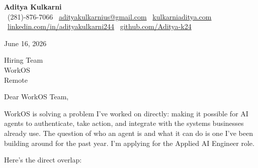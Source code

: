 \documentclass[11pt]{article}
\begin{document}
\begin{center}
  {\LARGE \textbf{Aditya Kulkarni}} \\[4pt]
  \small
  \faPhone\ (281)-876-7066 \quad
  \faEnvelope\ \href{mailto:adityakulkarnius@gmail.com}{adityakulkarnius@gmail.com} \quad
  \faGlobe\ \href{https://www.kulkarniaditya.com}{kulkarniaditya.com} \quad
  \faLinkedin\ \href{https://www.linkedin.com/in/adityakulkarni244/}{linkedin.com/in/adityakulkarni244} \quad
  \faGithub\ \href{https://github.com/Aditya-k24}{github.com/Aditya-k24}
\end{center}

\vspace{6pt}

June 16, 2026

\vspace{6pt}

Hiring Team \\
WorkOS \\
Remote

\vspace{10pt}

Dear WorkOS Team,

\vspace{6pt}

WorkOS is solving a problem I've worked on directly: making it possible for AI agents to authenticate, take action, and integrate with the systems businesses already use. The question of who an agent is and what it can do is one I've been building around for the past year. I'm applying for the Applied AI Engineer role.

\vspace{8pt}

Here's the direct overlap:
\end{document}
